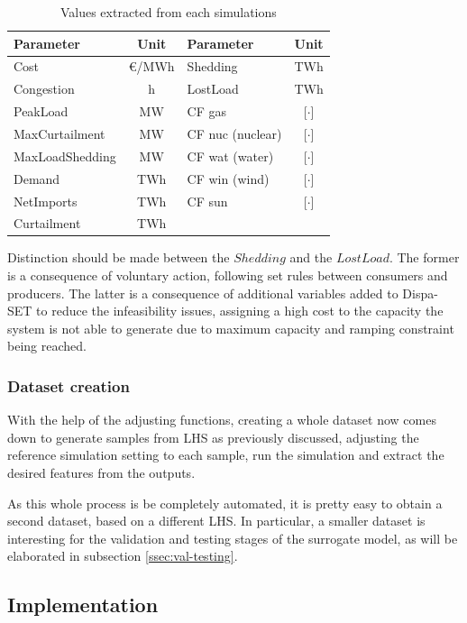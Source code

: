 \begin{table}[h]
    \centering
    \begin{tabular}{|l c|l c|}
		\hline
		Parameter & Unit & Parameter & Unit \\
		\hline
		Cost            & €/MWh & Shedding & TWh \\
		Congestion      & h     & LostLoad & TWh \\
		PeakLoad        & MW    & CF gas  & [$\cdot$] \\
		MaxCurtailment  & MW    & CF nuc (nuclear)  & [$\cdot$] \\
		MaxLoadShedding & MW    & CF wat (water)  & [$\cdot$] \\
		Demand          & TWh   & CF win (wind)  & [$\cdot$] \\
		NetImports      & TWh   & CF sun  & [$\cdot$] \\
		Curtailment     & TWh   &  &  \\
		\hline
	\end{tabular}
	\caption{Values extracted from each simulations}
	\label{table:values-extracted}
\end{table}

Distinction should be made between the $Shedding$ and the $LostLoad$. The former is a consequence of voluntary action, following set rules between consumers and producers. The latter is a consequence of additional variables added to Dispa-SET to reduce the infeasibility issues, assigning a high cost to the capacity the system is not able to generate due to maximum capacity and ramping constraint being reached.

\subsubsection{Dataset creation}

With the help of the adjusting functions, creating a whole dataset now comes down to generate samples from LHS as previously discussed, adjusting the reference simulation setting to each sample, run the simulation and extract the desired features from the outputs.

As this whole process is be completely automated, it is pretty easy to obtain a second dataset, based on a different LHS. In particular, a smaller dataset is interesting for the validation and testing stages of the surrogate model, as will be elaborated in subsection \ref{ssec:val-testing}.

\subsection{Implementation}

